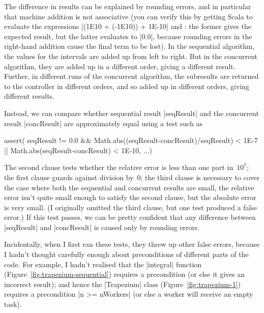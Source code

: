
The difference in results can be explained by rounding errors, and in
particular that machine addition is not associative (you can verify this by
getting Scala to evaluate the expressions |(1E10 + (-1E10)) + 1E-10| and
: the former gives the expected result, but the
latter evaluates to |0.0|, because rounding errors in the right-hand addition
cause the final term to be lost).
%
In the sequential algorithm, the values for the intervals are added up from
left to right.  But in the concurrent algorithm, they are added up in a
different order, giving a different result.  Further, in different runs of the
concurrent algorithm, the subresults are returned to the controller in
different orders, and so added up in different orders, giving different
results.


Instead, we can compare whether sequential result |seqResult| and the
concurrent result |concResult| are approximately equal using a test such as
\begin{scala}
  assert(
    seqResult != 0.0 && Math.abs((seqResult-concResult)/seqResult) < 1E-7 ||
      Math.abs(seqResult-concResult) < 1E-10, ...)
\end{scala}
%
The second clause tests whether the relative error is less than one part
in~$10^7$; the first clause guards against division by~$0$; the third clause
is necessary to cover the case where both the sequential and concurrent
results are small, the relative error isn't quite small enough to satisfy the
second clause, but the absolute error is very small.  (I originally omitted
the third clause, but one test produced a false error.)  If this test passes,
we can be pretty confident that any difference between |seqResult| and
|concResult| is caused only by rounding errors.

Incidentally, when I first ran these tests, they threw up other false errors,
because I hadn't thought carefully enough about preconditions of different
parts of the code.  For example, I hadn't realised that the |integral|
function (Figure~\ref{fig:trapezium-sequential}) requires a precondition
 (or else it gives an incorrect result); and hence the |Trapezium|
class (Figure~\ref{fig:trapezium-1}) requires a precondition |n >= nWorkers|
(or else a worker will receive an empty task).  
